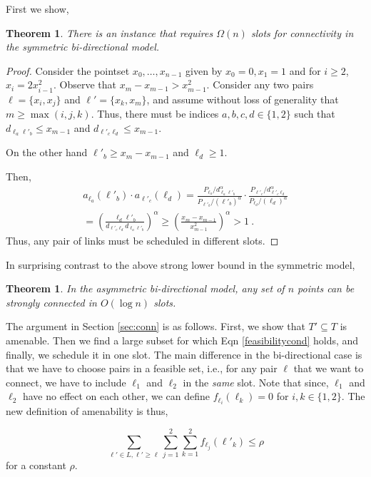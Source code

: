 \documentclass[11pt]{amsart}
\newcounter{foo}
\newtheorem{theorem}[foo]{Theorem}
\begin{document}
First we show,
\begin{theorem}
There is an instance that 
requires $\Omega(n)$ slots for connectivity in the symmetric bi-directional model.
\label{bidirlb}
\end{theorem}
\begin{proof}
Consider the pointset $x_0, \ldots, x_{n-1}$ given by
$x_0 = 0, x_1 = 1$ and for $i \ge 2$, $x_{i} = 2 x_{i-1}^2$.
Observe that $x_{m} - x_{m-1} > x_{m-1}^2$.
Consider any two pairs $\ell = \{x_i, x_j\}$ and $\ell'=\{x_k, x_m\}$,
and assume without loss of generality that $m \geq \max(i,j,k)$.
Thus, there must be indices $a, b, c, d \in \{1, 2\}$
such that $d_{\ell_a \ell'_b} \leq x_{m-1}$ and $d_{\ell'_c \ell_d} \leq x_{m-1}$.

On the other hand $\ell'_b \ge x_{m} - x_{m-1}$ and $\ell_d \geq 1$.

Then,
 \begin{align*}
a_{\ell_a}(\ell'_b) \cdot a_{\ell'_c}(\ell_d) = \frac{P_{\ell_a}/d_{\ell_a \ell'_b}^\alpha}{P_{\ell'_b}/(\ell'_b)^\alpha}
\cdot \frac{P_{\ell'_c}/d_{\ell'_c \ell_d}^\alpha}{P_{\ell_d}/(\ell_d)^\alpha} \\
 = \left( \frac{\ell_d \ell'_b}{d_{\ell'_c \ell_d} d_{\ell_a \ell'_b}} \right)^\alpha
 \ge  \left( \frac{x_m - x_{m-1}}{x^2_{m-1}}\right)^{\alpha}
 > 1\ .
 \end{align*}
Thus, any pair of links must be scheduled in different slots.
\end{proof}


In surprising contrast to the above strong lower bound in the symmetric model,
\begin{theorem}
In the asymmetric bi-directional model, any set of $n$ points
can be strongly connected in $O(\log n)$ slots.
\end{theorem}

The argument in Section \ref{sec:conn} is as follows. First, we show that $T' \subseteq T$ is amenable. Then
we find a large subset for which Eqn \ref{feasibilitycond} holds, and finally, we schedule it in one slot.
The main difference in the bi-directional case is that we have to choose pairs in a feasible set, i.e., for any
pair $\ell$ that we want to connect, we have to include $\ell_1$ and $\ell_2$ in the \emph{same} slot.
Note that since, $\ell_1$ and $\ell_2$ have no effect on each other, we can define $f_{\ell_i}(\ell_k) = 0$ for
$i, k \in \{1, 2\}$. The new definition of amenability is thus,

\begin{equation}
\sum_{\ell' \in L, \ell' \geq \ell} \sum_{j = 1}^2 \sum_{k = 1}^2 f_{\ell_j}(\ell'_k) \leq \rho
\end{equation}
for a constant $\rho$.
\end{document}
